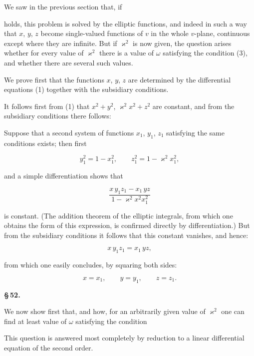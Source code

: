 
We saw in the previous section that, if


holds, this problem is solved by the elliptic functions, and indeed in such a way that $x$, $y$, $z$ become single-valued functions of $v$ in the whole $v$-plane, continuous except where they are infinite. But if $\varkappa^2$ is now given, the question arises whether for every value of $\varkappa^2$ there is a value of $\omega$ satisfying the condition (3), and whether there are several such values.

We prove first that the functions $x$, $y$, $z$ are  determined by the differential equations (1) together with the subsidiary conditions.

It follows first from (1) that $x^2+y^2$, $\varkappa^2x^2+z^2$ are constant, and from the subsidiary conditions there follows:


Suppose that a second system of functions $x_1$, $y_1$, $z_1$ satisfying the same conditions exists; then first

\[
y_1^2 = 1-x_1^2, \qquad z_1^2 = 1-\varkappa^2x_1^2,
\]

and a simple differentiation shows that

\[
\frac{x\,y_1z_1 - x_1\,yz}{1-\varkappa^2x^2x_1^2}
\]

is constant. (The addition theorem of the elliptic integrals, from which one obtains the form of this expression, is confirmed directly by differentiation.) But from the subsidiary conditions it follows that this constant vanishes, and hence:

\[
x\,y_1z_1 = x_1\,yz,
\]

from which one easily concludes, by squaring both sides:

\[
x = x_1, \qquad y=y_1, \qquad z=z_1.
\]

\begin{center}
\textbf{\S\,52. }
\end{center}

We now show first that, and how, for an arbitrarily given value of $\varkappa^2$ one can find at least  value of $\omega$ satisfying the condition


This question is answered most completely by reduction to a linear differential equation of the second order.
